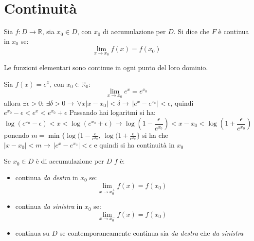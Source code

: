 \documentclass[a4paper,12pt, oneside]{book}
\begin{document}
\section{Continuità} Sia $f:D\rightarrow \mathbb{R}$, sia $x_0\in D$, con $x_0$
di accumulazione per $D$. Si dice che $F$ è continua in $x_0$ se:
$$\lim_{x\rightarrow x_0} f(x)=f(x_0)$$
\begin{teorema} Le funzioni elementari sono continue in ogni punto del loro
  dominio.
\end{teorema}
\begin{esempio} Sia $f(x)=e^x$, con $x_0\in\mathbb{R}_0$:
  $$\lim_{x\rightarrow x_0} e^x=e^{x_0}$$
  allora $\exists \epsilon>0:\,\exists \delta>0\rightarrow \, \forall x
  |x-x_0|<\delta\rightarrow \, |e^x-e^{x_0}|<\epsilon$, quindi
  $e^{x_0}-\epsilon<e^x<e^{x_0}+\epsilon$ Passando hai logaritmi si ha:
  $$\log(e^{x_0}-\epsilon)<x<\log(e^{x_0}+\epsilon)\longrightarrow \log(1-\frac{\epsilon}{e^{x_0}})<x-x_0<\log(1+\frac{\epsilon}{e^{x_0}})$$
  ponendo
  $m=\min\{\log(1-\frac{\epsilon}{e^{x_0}},\,\log(1+\frac{\epsilon}{e^{x_0}}\}$ si
  ha che $|x-x_0|<m\rightarrow \, |e^x-e^{x_0}|<\epsilon$ e quindi si ha
  continuità in $x_0$
\end{esempio}
\begin{nota} Se $x_0\in D$ è di accumulazione per $D$ $f$ è:
  \begin{itemize}
    \item continua \textit{da destra} in $x_0$ se:
    $$\lim_{x\rightarrow x_0^{+}} f(x)=f(x_0)$$
    \item continua \textit{da sinistra} in $x_0$ se:
    $$\lim_{x\rightarrow x_0^{-}} f(x)=f(x_0)$$
    \item continua su $D$ se contemporaneamente continua sia \textit{da destra}
    che \textit{da sinistra}
  \end{itemize}
\end{nota}
\newpage
\end{document}
